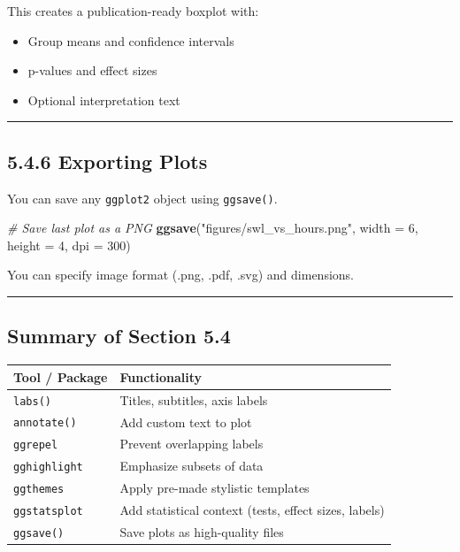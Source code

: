 \documentclass[
]{book}
\newenvironment{Shaded}{\begin{snugshade}}{\end{snugshade}}
\newcommand{\AttributeTok}[1]{\textcolor[rgb]{0.13,0.29,0.53}{#1}}
\newcommand{\CommentTok}[1]{\textcolor[rgb]{0.56,0.35,0.01}{\textit{#1}}}
\newcommand{\DecValTok}[1]{\textcolor[rgb]{0.00,0.00,0.81}{#1}}
\newcommand{\FunctionTok}[1]{\textcolor[rgb]{0.13,0.29,0.53}{\textbf{#1}}}
\newcommand{\NormalTok}[1]{#1}
\newcommand{\StringTok}[1]{\textcolor[rgb]{0.31,0.60,0.02}{#1}}
\providecommand{\tightlist}{%
  \setlength{\itemsep}{0pt}\setlength{\parskip}{0pt}}
\begin{document}
This creates a publication-ready boxplot with:

\begin{itemize}
\tightlist
\item
  Group means and confidence intervals
\item
  p-values and effect sizes
\item
  Optional interpretation text
\end{itemize}

\begin{center}\rule{0.5\linewidth}{0.5pt}\end{center}

\subsection{5.4.6 Exporting Plots}\label{exporting-plots}

You can save any \texttt{ggplot2} object using \texttt{ggsave()}.

\begin{Shaded}
\begin{Highlighting}[]
\CommentTok{\# Save last plot as a PNG}
\FunctionTok{ggsave}\NormalTok{(}\StringTok{"figures/swl\_vs\_hours.png"}\NormalTok{, }\AttributeTok{width =} \DecValTok{6}\NormalTok{, }\AttributeTok{height =} \DecValTok{4}\NormalTok{, }\AttributeTok{dpi =} \DecValTok{300}\NormalTok{)}
\end{Highlighting}
\end{Shaded}

You can specify image format (.png, .pdf, .svg) and dimensions.

\begin{center}\rule{0.5\linewidth}{0.5pt}\end{center}

\subsection{Summary of Section 5.4}\label{summary-of-section-5.4}

\begin{longtable}[]{@{}ll@{}}
\toprule\noalign{}
Tool / Package & Functionality \\
\midrule\noalign{}
\endhead
\bottomrule\noalign{}
\endlastfoot
\texttt{labs()} & Titles, subtitles, axis labels \\
\texttt{annotate()} & Add custom text to plot \\
\texttt{ggrepel} & Prevent overlapping labels \\
\texttt{gghighlight} & Emphasize subsets of data \\
\texttt{ggthemes} & Apply pre-made stylistic templates \\
\texttt{ggstatsplot} & Add statistical context (tests, effect sizes, labels) \\
\texttt{ggsave()} & Save plots as high-quality files \\
\end{longtable}
\end{document}
